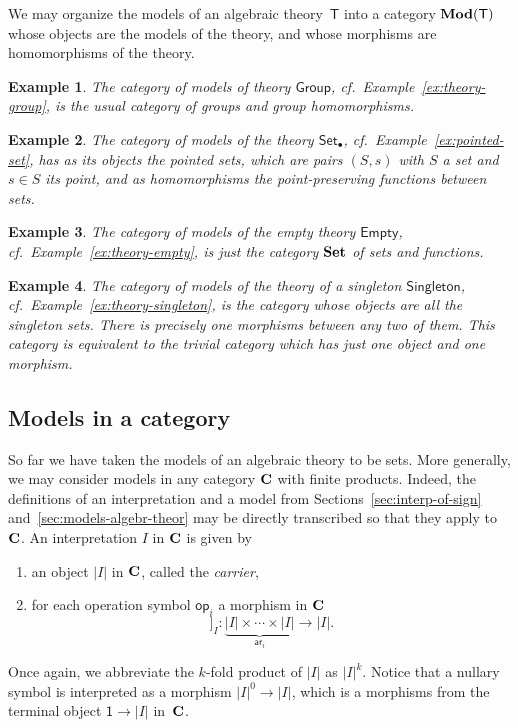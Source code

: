 \documentclass{amsart}
\newcommand{\theory}[1]{\mathsf{#1}} %
\newcommand{\Mod}[1]{\text{\textbf{Mod}}(\theory{#1})} %
\newcommand{\category}[1]{\text{\textbf{#1}}} %
\newcommand{\carrier}[1]{|#1|} %
\newcommand{\op}[1]{\mathsf{op}_{#1}} %
\newcommand{\arity}[1]{\mathsf{ar}_{#1}} %
\newcommand{\one}{\mathsf{1}} %
\newcommand{\sem}[1]{[\![#1]\!]} %
\newtheorem{example}{Example}[section]
\begin{document}
We may organize the models of an algebraic theory~$\theory{T}$ into a category $\Mod{T}$
whose objects are the models of the theory, and whose morphisms are homomorphisms of the
theory.

\begin{example}
  The category of models of theory $\theory{Group}$, cf.\ Example~\ref{ex:theory-group},
  is the usual category of groups and group homomorphisms.
\end{example}

\begin{example}
  The category of models of the theory $\theory{Set_\bullet}$, cf.\
  Example~\ref{ex:pointed-set}, has as its objects the pointed sets, which are pairs
  $(S, s)$ with $S$ a set and $s \in S$ its \emph{point}, and as homomorphisms
  the point-preserving functions between sets.
\end{example}

\begin{example}
  The category of models of the empty theory $\theory{Empty}$, cf.\
  Example~\ref{ex:theory-empty}, is just the category $\category{Set}$ of sets and
  functions.
\end{example}

\begin{example}
  The category of models of the theory of a singleton $\theory{Singleton}$, cf.\
  Example~\ref{ex:theory-singleton}, is the category whose objects are all the singleton
  sets. There is precisely one morphisms between any two of them. This category is
  equivalent to the trivial category which has just one object and one morphism.
\end{example}

\subsection{Models in a category}
\label{sec:models-category}

So far we have taken the models of an algebraic theory to be sets. More generally, we may
consider models in any category $\category{C}$ with finite products. Indeed, the
definitions of an interpretation and a model from Sections~\ref{sec:interp-of-sign}
and~\ref{sec:models-algebr-theor} may be directly transcribed so that they apply
to~$\category{C}$. An interpretation $I$ in $\category{C}$ is given by
%
\begin{enumerate}
\item an object $\carrier{I}$ in $\category{C}$, called the \emph{carrier},
\item for each operation symbol $\op{i}$ a morphism in $\category{C}$
  \begin{equation*}
    \sem{\op{i}}_I : \underbrace{\carrier{I} \times \cdots \times \carrier{I}}_{\arity{i}} \to \carrier{I}.
  \end{equation*}
\end{enumerate}
%
Once again, we abbreviate the $k$-fold product of $\carrier{I}$ as $\carrier{I}^k$. Notice that a nullary
symbol is interpreted as a morphism $\carrier{I}^0 \to \carrier{I}$, which is a morphisms from the
terminal object $\one \to \carrier{I}$ in~$\category{C}$.
\end{document}
